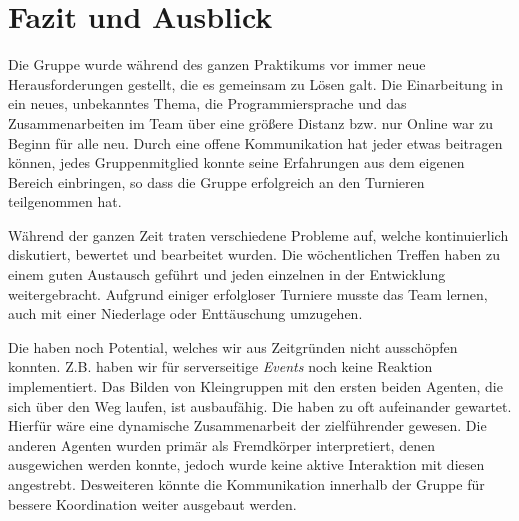 \newpage
\section{Fazit und Ausblick}

Die Gruppe wurde während des ganzen Praktikums vor immer neue Herausforderungen gestellt, die es gemeinsam zu Lösen galt. Die Einarbeitung in ein neues, unbekanntes Thema, die Programmiersprache und das Zusammenarbeiten im Team über eine größere Distanz bzw. nur Online war zu Beginn für alle neu. Durch eine offene Kommunikation hat jeder etwas beitragen können, jedes Gruppenmitglied konnte seine Erfahrungen aus dem eigenen Bereich einbringen, so dass die Gruppe erfolgreich an den Turnieren teilgenommen hat. \newline

Während der ganzen Zeit traten verschiedene Probleme auf, welche kontinuierlich diskutiert, bewertet und bearbeitet wurden. Die wöchentlichen Treffen haben zu einem guten Austausch geführt und jeden einzelnen in der Entwicklung weitergebracht. Aufgrund einiger erfolgloser Turniere musste das Team lernen, auch mit einer Niederlage oder Enttäuschung umzugehen. \newline

Die \Agents haben noch Potential, welches wir aus Zeitgründen nicht ausschöpfen konnten. Z.B. haben wir für serverseitige \textit{Events} noch keine Reaktion implementiert. Das Bilden von Kleingruppen mit den ersten beiden Agenten, die sich über den Weg laufen, ist ausbaufähig. Die \Agents haben zu oft aufeinander gewartet. Hierfür wäre eine dynamische Zusammenarbeit der \Agents zielführender  gewesen. Die anderen Agenten wurden primär als Fremdkörper interpretiert, denen ausgewichen werden konnte, jedoch wurde keine aktive Interaktion mit diesen angestrebt. Desweiteren könnte die Kommunikation innerhalb der Gruppe für bessere Koordination weiter ausgebaut werden. 

